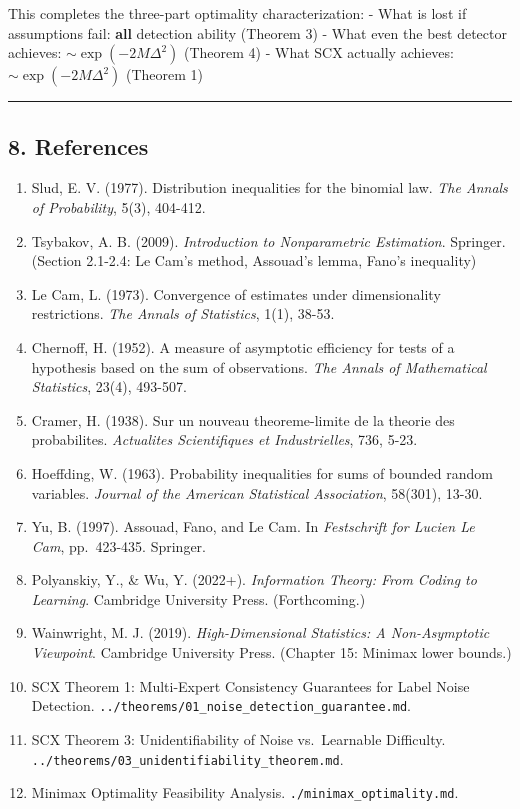 \documentclass[
  12pt,
]{ctexart}
\begin{document}
This completes the three-part optimality characterization: - What is
lost if assumptions fail: \textbf{all} detection ability (Theorem 3) -
What even the best detector achieves: \(\sim\exp(-2M\Delta^2)\) (Theorem
4) - What SCX actually achieves: \(\sim\exp(-2M\Delta^2)\) (Theorem 1)

\begin{center}\rule{0.5\linewidth}{0.5pt}\end{center}

\subsection{8. References}\label{references}

\begin{enumerate}
\def\labelenumi{\arabic{enumi}.}
\item
  Slud, E. V. (1977). Distribution inequalities for the binomial law.
  \emph{The Annals of Probability}, 5(3), 404-412.
\item
  Tsybakov, A. B. (2009). \emph{Introduction to Nonparametric
  Estimation}. Springer. (Section 2.1-2.4: Le Cam's method, Assouad's
  lemma, Fano's inequality)
\item
  Le Cam, L. (1973). Convergence of estimates under dimensionality
  restrictions. \emph{The Annals of Statistics}, 1(1), 38-53.
\item
  Chernoff, H. (1952). A measure of asymptotic efficiency for tests of a
  hypothesis based on the sum of observations. \emph{The Annals of
  Mathematical Statistics}, 23(4), 493-507.
\item
  Cramer, H. (1938). Sur un nouveau theoreme-limite de la theorie des
  probabilites. \emph{Actualites Scientifiques et Industrielles}, 736,
  5-23.
\item
  Hoeffding, W. (1963). Probability inequalities for sums of bounded
  random variables. \emph{Journal of the American Statistical
  Association}, 58(301), 13-30.
\item
  Yu, B. (1997). Assouad, Fano, and Le Cam. In \emph{Festschrift for
  Lucien Le Cam}, pp.~423-435. Springer.
\item
  Polyanskiy, Y., \& Wu, Y. (2022+). \emph{Information Theory: From
  Coding to Learning}. Cambridge University Press. (Forthcoming.)
\item
  Wainwright, M. J. (2019). \emph{High-Dimensional Statistics: A
  Non-Asymptotic Viewpoint}. Cambridge University Press. (Chapter 15:
  Minimax lower bounds.)
\item
  SCX Theorem 1: Multi-Expert Consistency Guarantees for Label Noise
  Detection. \texttt{../theorems/01\_noise\_detection\_guarantee.md}.
\item
  SCX Theorem 3: Unidentifiability of Noise vs.~Learnable Difficulty.
  \texttt{../theorems/03\_unidentifiability\_theorem.md}.
\item
  Minimax Optimality Feasibility Analysis.
  \texttt{./minimax\_optimality.md}.
\end{enumerate}
\end{document}

